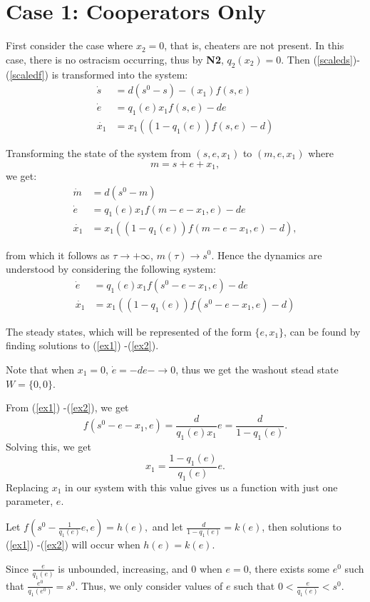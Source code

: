 \documentclass[12pt]{article}
\begin{document}
\section{Case 1: Cooperators Only}

\noindent First consider the case where $x_2=0$, that is, cheaters are not present. In this case, there is no ostracism occurring, thus by \textbf{N2}, $q_2(x_2) =0$. Then (\ref{scaleds})-(\ref{scaledf}) is transformed into the system: 
\begin{align}
\dot{s}&=d(s^0-s)-(x_1) f(s,e) \label{nox2s}\\
\dot{e}&=q_1(e) x_1 f(s,e)-de\\
\dot{x_1} &= x_1((1-q_1(e))f(s,e)-d)\label{nox2f}
\end{align}

\noindent Transforming the state of the system from $(s,e,x_1)$ to $(m,e,x_1)$ where $$m=s+e+x_1,$$ we get: 
\begin{align*}
\dot{m}&=d(s^0-m)\\
\dot{e}&=q_1(e) x_1 f(m-e-x_1,e)-de\\
\dot{x_1} &= x_1((1-q_1(e))f(m-e-x_1,e)-d),
\end{align*}

\noindent from which it follows as $\tau \rightarrow +\infty$, $m(\tau ) \rightarrow s^0$. Hence the dynamics are understood by considering the following system: 
\begin{align}
\dot{e}&=q_1(e) x_1 f(s^0-e-x_1,e)-de\label{ex1} \\ 
\dot{x_1} &= x_1((1-q_1(e))f(s^0-e-x_1,e)-d) \label{ex2}
\end{align}

\noindent The steady states, which will be represented of the form $\{e,x_1\}$, can be found by finding solutions to (\ref{ex1}) -(\ref{ex2}). 

\noindent Note that when $x_1 =0$, $\dot{e}=-de -\rightarrow 0$, thus we get the washout stead state $W=\{0,0\}$.

\noindent From (\ref{ex1}) -(\ref{ex2}), we get $$f(s^0-e-x_1,e)=\frac{d}{q_1(e)x_1}e = \frac{d}{1-q_1(e)}.$$ Solving this, we get $$x_1=\frac{1-q_1(e)}{q_1(e)}e.$$ Replacing $x_1$ in our system with this value gives us a function with just one parameter, $e$.

\noindent Let $f(s^0-\frac{1}{q_1(e)}e,e) = h(e),$ and let $\frac{d}{1-q_1(e)} = k(e)$, then solutions to (\ref{ex1}) -(\ref{ex2}) will occur when $h(e)=k(e).$

\noindent Since $\frac{e}{q_1(e)}$ is unbounded, increasing, and 0 when $e=0$, there exists some $e^0$ such that $\frac{e^0}{q_1(e^0)}=s^0.$ Thus, we only consider values of $e$ such that $0<\frac{e}{q_1(e)}<s^0.$
\end{document}

